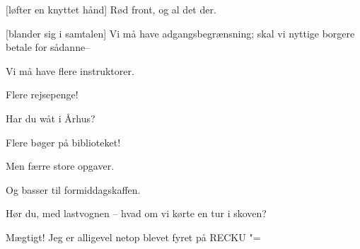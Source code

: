 \documentclass[a4paper,11pt]{article}
\begin{document}
\begin{sketch}
  [løfter en knyttet hånd] Rød front, og al det der.

  [blander sig i samtalen] Vi må have adgangsbegrænsning; skal vi nyttige borgere betale for sådanne--

   Vi må have flere instruktorer.

   Flere rejsepenge!

  Har du wåt i Århus?

  Flere bøger på biblioteket!

  Men færre store opgaver.

  Og basser til formiddagskaffen.


 Hør du, med lastvognen -- hvad om vi kørte en tur i skoven?

 Mægtigt!  Jeg er alligevel netop blevet fyret på RECKU "= 


\end{sketch}
\end{document}
